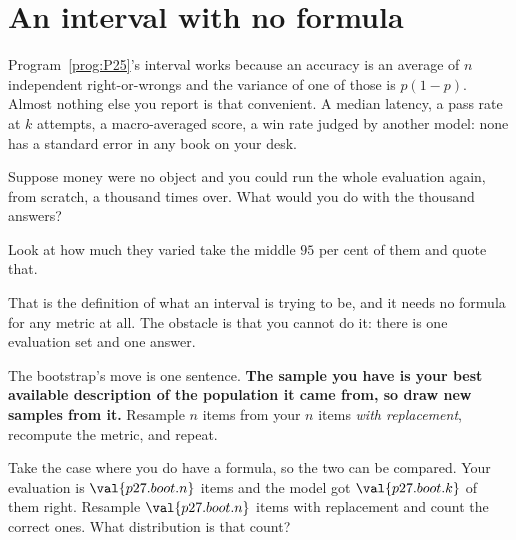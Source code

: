 \section{An interval with no formula}
\label{sec:P27-bootstrap}

\begin{fr}
Program~\ref{prog:P25}'s interval works because an accuracy is an average of
$n$ independent right-or-wrongs and the variance of one of those is
$p(1-p)$. Almost nothing else you report is that convenient. A median
latency, a pass rate at $k$ attempts, a macro-averaged score, a win rate
judged by another model: none has a standard error in any book on your desk.

Suppose money were no object and you could run the whole evaluation again,
from scratch, a thousand times over. What would you do with the thousand
answers?
\dotline
\nextframe
\end{fr}

\begin{fr}
\begin{ansblock}
Look at how much they varied \dash{} take the middle $95$ per cent of them
and quote that.
\end{ansblock}

That is the definition of what an interval is trying to be, and it needs no
formula for any metric at all. The obstacle is that you cannot do it: there
is one evaluation set and one answer.

The bootstrap's move is one sentence. \textbf{The sample you have is your
best available description of the population it came from, so draw new
samples from it.} Resample $n$ items from your $n$ items \emph{with
replacement}, recompute the metric, and repeat.

Take the case where you do have a formula, so the two can be compared. Your
evaluation is $\val{p27.boot.n}$ items and the model got $\val{p27.boot.k}$
of them right. Resample $\val{p27.boot.n}$ items with replacement and count
the correct ones. What distribution is that count?
\dotline
\nextframe
\end{fr}

